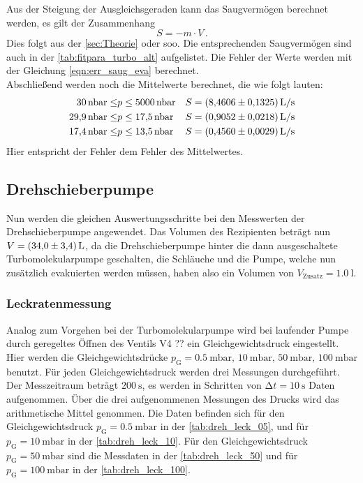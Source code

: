     \noindent Aus der Steigung der Ausgleichsgeraden kann das Saugvermögen berechnet werden, es gilt der Zusammenhang
    \begin{equation*}
      S = - m \cdot V\, .
    \end{equation*}
    Dies folgt aus der \autoref{sec:Theorie} oder soo. Die entsprechenden Saugvermögen sind auch in der \autoref{tab:fitpara_turbo_alt} aufgelistet. 
    Die Fehler der Werte werden mit der Gleichung \eqref{eqn:err_saug_eva} berechnet.\\ 
    Abschließend werden noch die Mittelwerte berechnet, die wie folgt lauten:
    \begin{align*}
      \SI{30}{\nano\bar} \leq &p \leq \SI{5000}{\nano\bar} & S &= \SI{8.4606 \pm 0.1325}{L\per\second} \\
      \SI{29.9}{\nano\bar} \leq &p \leq \SI{17.5}{\nano\bar}& S &= \SI{0.9052 \pm 0.0218}{L\per\second} \\
      \SI{17.4}{\nano\bar} \leq &p \leq \SI{13.5}{\nano\bar} & S &= \SI{0.4560 \pm 0.0029}{L\per\second}
    \end{align*}
    Hier entspricht der Fehler dem Fehler des Mittelwertes.

\subsection{Drehschieberpumpe}

    \noindent Nun werden die gleichen Auswertungsschritte bei den Messwerten der Drehschieberpumpe angewendet. Das Volumen des Rezipienten beträgt nun $V = \SI{34 \pm 3.4}{\litre}$, da die 
    Drehschieberpumpe hinter die dann ausgeschaltete Turbomolekularpumpe geschalten, die Schläuche und die Pumpe, welche nun zusätzlich evakuierten werden müssen, haben also ein Volumen von $V_\text{Zusatz} = \SI{1.0}{\litre}$. 

    \subsubsection{Leckratenmessung}

    \noindent Analog zum Vorgehen bei der Turbomolekularpumpe wird bei laufender Pumpe durch geregeltes Öffnen des Ventils V4 ?? ein Gleichgewichtsdruck eingestellt. Hier werden die
    Gleichgewichtsdrücke $p_\text{G} = \SI{0.5}{\milli\bar}, \, \SI{10}{\milli\bar}, \, \SI{50}{\milli\bar}, \, \SI{100}{\milli\bar}$ benutzt. Für jeden Gleichgewichtsdruck werden 
    drei Messungen durchgeführt. Der Messzeitraum beträgt $\SI{200}{\second}$, es werden in Schritten von $\increment t = \SI{10}{\second}$ Daten aufgenommen. Über die drei aufgenommenen
    Messungen des Drucks wird das arithmetische Mittel genommen. 
    Die Daten befinden sich für den Gleichgewichtsdruck $p_\text{G} = \SI{0.5}{\milli\bar}$ in der \autoref{tab:dreh_leck_05}, und für $p_\text{G} = \SI{10}{\milli\bar}$ in der 
    \autoref{tab:dreh_leck_10}. Für den Gleichgewichtsdruck $p_\text{G} = \SI{50}{\milli\bar}$ sind die Messdaten in der \autoref{tab:dreh_leck_50} und für $p_\text{G} = \SI{100}{\milli\bar}$
    in der \autoref{tab:dreh_leck_100}.

